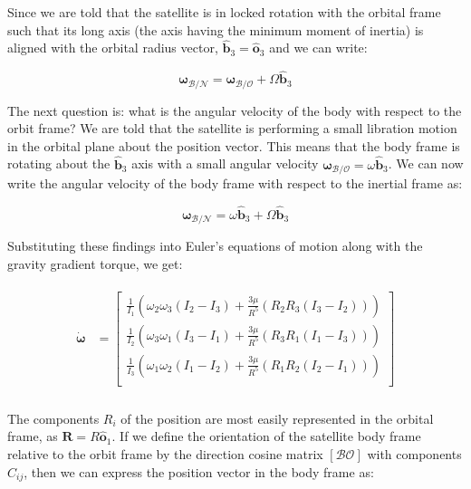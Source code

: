 \documentclass[
]{article}
\begin{document}
Since we are told that the satellite is in locked rotation with the
orbital frame such that its long axis (the axis having the minimum
moment of inertia) is aligned with the orbital radius vector,
\(\hat{\boldsymbol{b}}_3 = \hat{\boldsymbol{o}}_3\) and we can write:

\[\boldsymbol{\omega}_\mathcal{B/N} = \boldsymbol{\omega}_\mathcal{B/O} + \Omega \hat{\boldsymbol{b}}_3\]

The next question is: what is the angular velocity of the body with
respect to the orbit frame? We are told that the satellite is performing
a small libration motion in the orbital plane about the position vector.
This means that the body frame is rotating about the
\(\hat{\boldsymbol{b}}_3\) axis with a small angular velocity
\(\boldsymbol{\omega}_\mathcal{B/O} = \omega \hat{\boldsymbol{b}}_3\).
We can now write the angular velocity of the body frame with respect to
the inertial frame as:

\[\boldsymbol{\omega}_\mathcal{B/N} = \omega \hat{\boldsymbol{b}}_3 + \Omega \hat{\boldsymbol{b}}_3\]

Substituting these findings into Euler's equations of motion along with
the gravity gradient torque, we get:

\[\begin{aligned}
\begin{aligned}
    \dot{\boldsymbol{\omega}} &= \begin{bmatrix}
        \frac{1}{I_1} \left(\omega_2 \omega_3 \left(I_2 - I_3\right) + \frac{3 \mu}{R^5} \left(R_2 R_3 \left(I_3 - I_2\right)\right)\right) \\
        \frac{1}{I_2} \left(\omega_3 \omega_1 \left(I_3 - I_1\right) + \frac{3 \mu}{R^5} \left(R_3 R_1 \left(I_1 - I_3\right)\right)\right) \\
        \frac{1}{I_3} \left(\omega_1 \omega_2 \left(I_1 - I_2\right) + \frac{3 \mu}{R^5} \left(R_1 R_2 \left(I_2 - I_1\right)\right)\right) \\
    \end{bmatrix} \\
\end{aligned}
\end{aligned}\]

The components \(R_i\) of the position are most easily represented in
the orbital frame, as \(\boldsymbol{R} = R \hat{\boldsymbol{o}}_1\). If
we define the orientation of the satellite body frame relative to the
orbit frame by the direction cosine matrix \(\left[\mathcal{BO}\right]\)
with components \(C_{ij}\), then we can express the position vector in
the body frame as:
\end{document}
